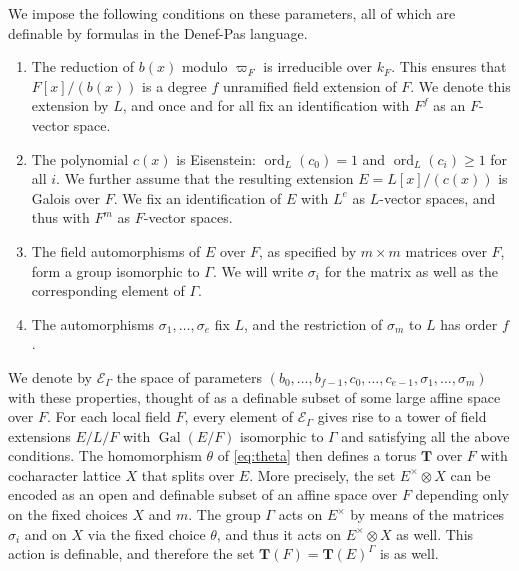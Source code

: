 \documentclass{amsart}
\newcommand{\gal}{\operatorname{Gal}}
\newcommand{\bT}{\mathbf {T}}
\newcommand\cE{{\mathcal E}}
\DeclareMathOperator{\ord}{ord}
\theoremstyle{plain}
\theoremstyle{definition}
\begin{document}
We impose the following conditions on these parameters, all of which are definable by formulas in the Denef-Pas language. 
\begin{enumerate}
\item The reduction of $b(x)$ modulo $\varpi_F$ is irreducible over $k_F$. 
This ensures that $F[x]/(b(x))$ is a degree $f$ unramified field extension of $F$. 
We denote this extension by $L$, and once and for all fix an identification with $F^f$ as 
an $F$-vector space. 
\item The polynomial $c(x)$ is Eisenstein: $\ord_L(c_0) = 1$ and $\ord_L(c_i) \ge 1$ for all $i$.
We further assume that the resulting extension $E = L[x]/(c(x))$ is Galois over $F$.
We fix an identification of $E$ with $L^e$ as $L$-vector spaces, and thus with $F^m$ as $F$-vector spaces. 
\item The field automorphisms of $E$ over $F$, as specified by $m \times m$ matrices over $F$, form a group isomorphic to $\Gamma$.
We will write $\sigma_i$ for the matrix as well as the corresponding element of $\Gamma$.
\item The automorphisms $\sigma_1, \dots, \sigma_e$ fix $L$, and the restriction of $\sigma_m$ to $L$ has order $f$.
\end{enumerate}
We denote by $\cE_\Gamma$ the space of parameters $(b_0, \dots, b_{f-1}, c_0, \dots, c_{e-1}, \sigma_1, \dots, \sigma_m)$ with these properties,
thought of as a definable subset of some large affine space over $F$.
For each local field $F$, every element of $\cE_\Gamma$ gives rise to a tower of field extensions $E/L/F$
with $\gal(E/F)$ isomorphic to $\Gamma$ and satisfying all the above conditions.
The homomorphism $\theta$ of \eqref{eq:theta} then defines a torus $\bT$ over $F$ with cocharacter lattice $X$ that splits over $E$.
More precisely, the set $E^\times \otimes X$ can be encoded as an open and definable subset of an affine space over $F$ depending only on the fixed choices $X$ and $m$.  The group $\Gamma$ acts on $E^\times$ by means of the matrices $\sigma_i$ and on $X$ via the fixed choice $\theta$, and thus it acts on $E^\times \otimes X$ as well. 
This action is definable, and therefore the set $\bT(F) = \bT(E)^\Gamma$ is as well.
\end{document}
